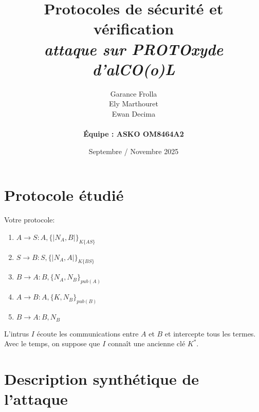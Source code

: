 \documentclass[11pt]{article}
\begin{document}
\title{\textbf{Protocoles de sécurité et vérification} \\
{\small \textit{attaque sur PROTOxyde d'alCO(o)L}}}

\author{Garance Frolla \\ Ely Marthouret \\ Ewan Decima \\\\ \textbf{Équipe : ASKO OM8464A2}}
\date{Septembre / Novembre 2025}

\maketitle
\tableofcontents
\newpage

\section{Protocole étudié}

Votre protocole:

\begin{enumerate}
    \item $A \rightarrow S : A, \{|N_A,B|\}_{K\{AS\}}$
    \item $S \rightarrow B : S, \{|N_A,A|\}_{K\{BS\}}$
    \item $B \rightarrow A : B, \{N_A,N_B\}_{pub(A)}$
    \item $A \rightarrow B : A, \{K,N_B\}_{pub(B)}$
    \item $B \rightarrow A : B,N_B$
\end{enumerate}

\bigskip
\noindent
L'intrus $I$ écoute les communications entre $A$ et $B$ et intercepte tous les termes. Avec le temps, on suppose que $I$ connaît une ancienne clé $K^*$.

\section{Description synthétique de l'attaque}
\end{document}
